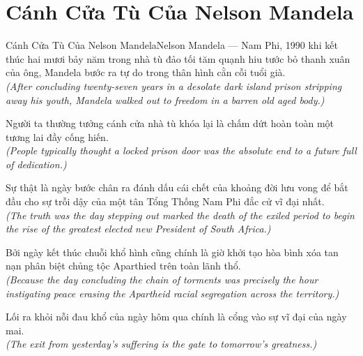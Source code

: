 \section{Cánh Cửa Tù Của Nelson Mandela}
\begin{truyen}{Cánh Cửa Tù Của Nelson Mandela}{Nelson Mandela --- Nam Phi, 1990}
 khi kết thúc hai mươi bảy năm trong nhà tù đảo tối tăm quạnh hiu tước bỏ thanh xuân của ông, Mandela bước ra tự do trong thân hình cằn cỗi tuổi già.\\[4pt]
\textit{(After concluding twenty-seven years in a desolate dark island prison stripping away his youth, Mandela walked out to freedom in a barren old aged body.)}

Người ta thường tưởng cánh cửa nhà tù khóa lại là chấm dứt hoàn toàn một tương lai đầy cống hiến.\\[4pt]
\textit{(People typically thought a locked prison door was the absolute end to a future full of dedication.)}

Sự thật là ngày bước chân ra đánh dấu cái chết của khoảng đời lưu vong để bắt đầu cho sự trỗi dậy của một tân Tổng Thống Nam Phi đắc cử vĩ đại nhất.\\[4pt]
\textit{(The truth was the day stepping out marked the death of the exiled period to begin the rise of the greatest elected new President of South Africa.)}

Bởi ngày kết thúc chuỗi khổ hình cũng chính là giờ khởi tạo hòa bình xóa tan nạn phân biệt chủng tộc Aparthied trên toàn lãnh thổ.\\[4pt]
\textit{(Because the day concluding the chain of torments was precisely the hour instigating peace erasing the Apartheid racial segregation across the territory.)}

\end{truyen}
\begin{baihoc}
  Lối ra khỏi nỗi đau khổ của ngày hôm qua chính là cổng vào sự vĩ đại của ngày mai.\\[4pt]
  \textit{(The exit from yesterday's suffering is the gate to tomorrow's greatness.)}
\end{baihoc}

